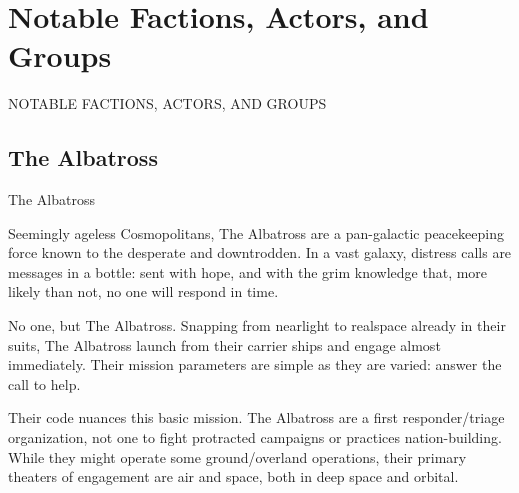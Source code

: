 \section{Notable Factions, Actors, and Groups}


                                                  NOTABLE FACTIONS,  
                                                  ACTORS, AND  
                                                  GROUPS  
\subsection{The Albatross}
                                                  The Albatross  

                                                  Seemingly ageless Cosmopolitans, The Albatross  
                                                  are a pan-galactic peacekeeping force known to the  
                                                  desperate and downtrodden. In a vast galaxy,  
                                                  distress calls are messages in a bottle: sent with  
                                                  hope, and with the grim knowledge that, more likely  
                                                  than not, no one will respond in time. 
 

                                                  No one, but The Albatross. Snapping from nearlight  
                                                  to realspace already in their suits, The Albatross  
                                                  launch from their carrier ships and engage almost  
                                                  immediately. Their mission parameters are simple as  
                                                  they are varied: answer the call to help. 
 

                                                  Their code nuances this basic mission. The  
                                                  Albatross are a first responder/triage organization,  
                                                  not one to fight protracted campaigns or practices  
                                                  nation-building. While they might operate some  
                                                  ground/overland operations, their primary theaters  
                                                  of engagement are air and space, both in deep  
                                                  space and orbital.  
 


